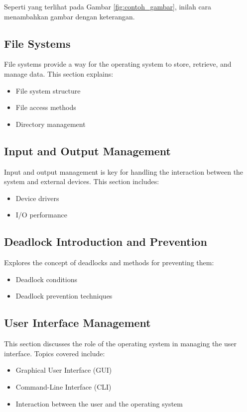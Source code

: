\documentclass[12pt]{article}
\begin{document}
Seperti yang terlihat pada Gambar \ref{fig:contoh_gambar}, inilah cara menambahkan gambar dengan keterangan.

\subsection{File Systems}
File systems provide a way for the operating system to store, retrieve, and manage data. This section explains:
\begin{itemize}
    \item File system structure
    \item File access methods
    \item Directory management
\end{itemize}

\subsection{Input and Output Management}
Input and output management is key for handling the interaction between the system and external devices. This section includes:
\begin{itemize}
    \item Device drivers
    \item I/O performance
\end{itemize}

\subsection{Deadlock Introduction and Prevention}
Explores the concept of deadlocks and methods for preventing them:
\begin{itemize}
    \item Deadlock conditions
    \item Deadlock prevention techniques
\end{itemize}

\subsection{User Interface Management}
This section discusses the role of the operating system in managing the user interface. Topics covered include:
\begin{itemize}
    \item Graphical User Interface (GUI)
    \item Command-Line Interface (CLI)
    \item Interaction between the user and the operating system
\end{itemize}
\end{document}
